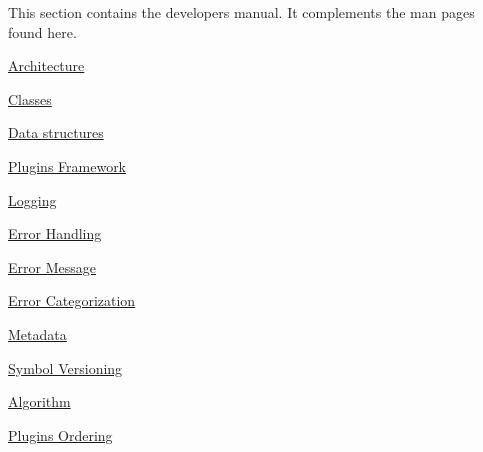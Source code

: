 This section contains the developer\textquotesingle{}s manual. It complements the man pages found here.


\begin{DoxyItemize}
\item \hyperlink{doc_dev_architecture_md}{Architecture}
\item \hyperlink{doc_dev_classes_md}{Classes}
\item \hyperlink{doc_dev_data-structures_md}{Data structures}
\item \hyperlink{doc_dev_plugins-framework_md}{Plugins Framework}
\end{DoxyItemize}


\begin{DoxyItemize}
\item \hyperlink{doc_dev_logging_md}{Logging}
\item \hyperlink{doc_dev_error-handling_md}{Error Handling}
\item \hyperlink{doc_dev_error-message_md}{Error Message}
\item \hyperlink{doc_dev_error-categorization_md}{Error Categorization}
\item \hyperlink{doc_dev_metadata_md}{Metadata}
\item \hyperlink{doc_dev_symbol-versioning_md}{Symbol Versioning}
\end{DoxyItemize}


\begin{DoxyItemize}
\item \hyperlink{doc_dev_algorithm_md}{Algorithm}
\item \hyperlink{doc_dev_plugins-ordering_md}{Plugins Ordering} 
\end{DoxyItemize}